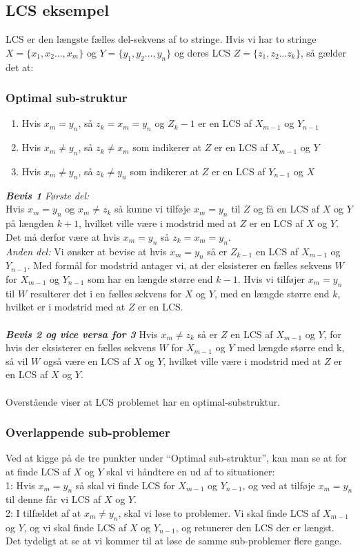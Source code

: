 \documentclass[12pt]{article}
\begin{document}
\subsection*{LCS eksempel}
LCS er den længste fælles del-sekvens af to stringe.
Hvis vi har to stringe $X = \{x_1, x_2...,x_m\}$ og $Y=\{y_1, y_2...,y_n\}$ og deres LCS $Z=\{z_1, z_2...z_k\}$, så gælder det at:
\subsubsection*{Optimal sub-struktur}
\begin{enumerate}
  \item{Hvis $x_m=y_n$, så $z_k=x_m=y_n$ og $Z_k-1$ er en LCS af $X_{m-1}$ og $Y_{n-1}$}
  \item{Hvis $x_m \neq y_n$, så $z_k \neq x_m$ som indikerer at $Z$ er en LCS af $X_{m-1}$ og $Y$}
  \item{Hvis $x_m \neq y_n$, så $z_k \neq y_n$ som indikerer at $Z$ er en LCS af $Y_{n-1}$ og $X$}
\end{enumerate}
\textbf{\textit{Bevis 1}}
\textit{Første del:}\\
Hvis $x_m=y_n$ og $x_m\neq z_k$ så kunne vi tilføje $x_m=y_n$ til $Z$ og få en LCS af $X$ og $Y$ på længden $k+1$, hvilket ville være i modstrid med at $Z$ er en LCS af $X$ og $Y$. Det må derfor være at hvis $x_m=y_n$ så $z_k=x_m=y_n$.\\
\textit{Anden del:}
Vi ønsker at bevise at hvis $x_m=y_n$ så er $Z_{k-1}$ en LCS af $X_{m-1}$ og $Y_{n-1}$. Med formål for modstrid antager vi, at der eksisterer en fælles sekvens $W$ for $X_{m-1}$ og $Y_{n-1}$ som har en længde større end $k-1$. Hvis vi tilføjer $x_m=y_n$ til $W$ resulterer det i en fælles sekvens for $X$ og $Y$, med en længde større end $k$, hvilket er i modstrid med at $Z$ er en LCS.
\\\\\textbf{\textit{Bevis 2 og vice versa for 3}}
Hvis $x_m \neq z_k$ så er $Z$ en LCS af $X_{m-1}$ og $Y$, for hvis der eksisterer en fælles sekvens $W$ for $X_{m-1}$ og $Y$ med længde større end k, så vil $W$ også være en LCS af $X$ og $Y$, hvilket ville være i modstrid med at $Z$ er en LCS af $X$ og $Y$.\\\\
Overstående viser at LCS problemet har en optimal-substruktur.
\subsubsection*{Overlappende sub-problemer}
Ved at kigge på de tre punkter under ``Optimal sub-struktur'', kan man se at for at finde LCS af $X$ og $Y$ skal vi håndtere en ud af to situationer:\\
1: Hvis $x_m=y_n$ så skal vi finde LCS for $X_{m-1}$ og $Y_{n-1}$, og ved at tilføje $x_m=y_n$ til denne får vi LCS af $X$ og $Y$.\\
2: I tilfældet af at $x_m\neq y_n$, skal vi løse to problemer. Vi skal finde LCS af $X_{m-1}$ og $Y$, og vi skal finde LCS af $X$ og $Y_{n-1}$, og retunerer den LCS der er længst.\\
Det tydeligt at se at vi kommer til at løse de samme sub-problemer flere gange.
\end{document}
